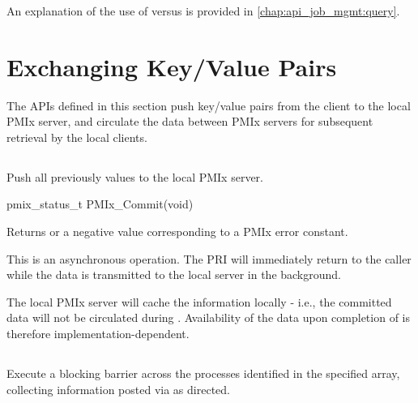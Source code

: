 \adviceuserstart
An explanation of the use of  versus  is provided in \ref{chap:api_job_mgmt:query}.
\adviceuserend

\section{Exchanging Key/Value Pairs}
\label{chap:api_kv_mgmt:exchange}

The APIs defined in this section push key/value pairs from the client to the local \ac{PMIx} server, and circulate the data between \ac{PMIx} servers for subsequent retrieval by the local clients.

\subsection{}

\summary

Push all previously  values to the local PMIx server.

\format

\cspecificstart
\begin{codepar}
pmix_status_t PMIx_Commit(void)
\end{codepar}
\cspecificend

Returns  or a negative value corresponding to a PMIx error constant.

\descr

This is an asynchronous operation.
The \ac{PRI} will immediately return to the caller while the data is transmitted to the local server in the background.

\adviceuserstart
The local PMIx server will cache the information locally - i.e., the committed data will not be circulated during .
Availability of the data upon completion of  is therefore implementation-dependent.
\adviceuserend


\subsection{}

\summary

Execute a blocking barrier across the processes identified in the specified array, collecting information posted via  as directed.

